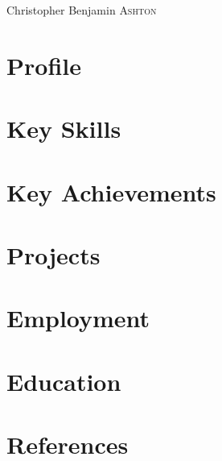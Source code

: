 \documentclass[class=article, crop=false]{standalone}
\begin{document}
\par{\centering
        {\Huge Christopher Benjamin \textsc{Ashton}
    }\bigskip\par}

\begin{center}
\customcontact
\end{center}

\section{Profile}


\section{Key Skills}


\section{Key Achievements}


\section{Projects}


\section{Employment}


\section{Education}


\section{References}
\customreferences
\end{document}
